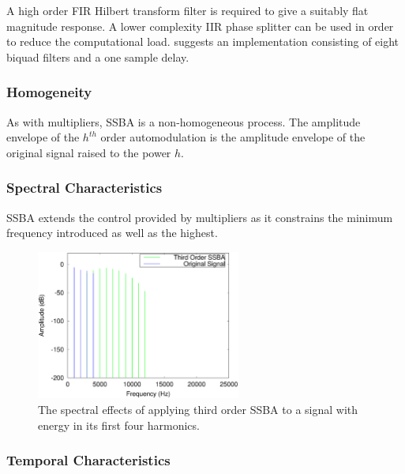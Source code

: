 			A high order FIR Hilbert transform filter is required to give a suitably flat magnitude response.
			A lower complexity IIR phase splitter can be used in order to reduce the computational load.
			\citet{niemitalo2003hilbert} suggests an implementation consisting of eight biquad filters and a
			one sample delay.
			
		\subsubsection*{Homogeneity}
			As with multipliers, SSBA is a non-homogeneous process. The amplitude envelope of the $h^{th}$
			order automodulation is the amplitude envelope of the original signal raised to the power $h$. 

		\subsubsection*{Spectral Characteristics}
			SSBA extends the control provided by multipliers as it constrains the minimum frequency introduced
			as well as the highest.

			\begin{figure}[h!]
				\centering
				\includegraphics[width=0.6\textwidth]{chapter3/Images/SSBA3Spectra.eps}
				\caption{The spectral effects of applying third order SSBA to a signal with energy in its 
				         first four harmonics.}
				\label{fig:SSBA3Spectra}
			\end{figure}

		\subsubsection*{Temporal Characteristics}

